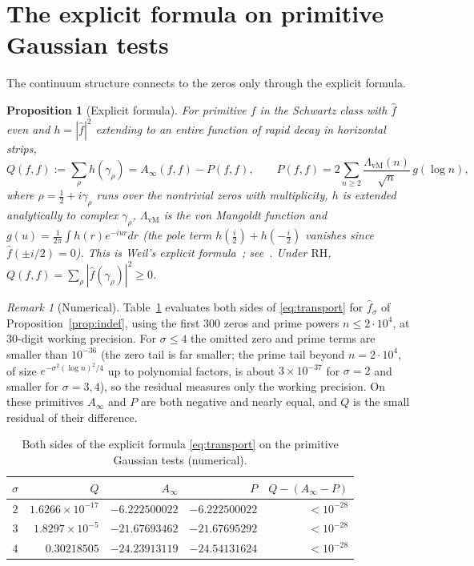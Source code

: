 \documentclass[11pt]{amsart}
\newtheorem{proposition}[theorem]{Proposition}
\theoremstyle{definition}
\theoremstyle{remark}
\newtheorem{remark}[theorem]{Remark}
\newcommand{\RH}{\mathrm{RH}}
\newcommand{\Ainf}{A_\infty}
\newcommand{\vM}{\Lambda_{\mathrm{vM}}}
\begin{document}
\section{The explicit formula on primitive Gaussian tests}\label{sec:transport}
The continuum structure connects to the zeros only through the explicit formula.

\begin{proposition}[Explicit formula]\label{prop:transport}
For primitive $f$ in the Schwartz class with $\widehat f$ even and $h=|\widehat f|^2$ extending to an
entire function of rapid decay in horizontal strips,
\begin{equation}\label{eq:transport}
Q(f,f):=\sum_\rho h(\gamma_\rho)
=\Ainf(f,f)-P(f,f),\qquad
P(f,f)=2\sum_{n\ge2}\frac{\vM(n)}{\sqrt n}\,g(\log n),
\end{equation}
where $\rho=\tfrac12+i\gamma_\rho$ runs over the nontrivial zeros with
multiplicity, $h$ is extended analytically to complex $\gamma_\rho$, $\vM$ is
the von Mangoldt function and $g(u)=\frac1{2\pi}\int h(r)e^{-iur}dr$ (the pole
term $h(\frac i2)+h(-\frac i2)$ vanishes since $\widehat f(\pm i/2)=0$). This is
Weil's explicit formula~\cite{Weil52}; see~\cite[Thm.~5.12]{bgIK}. Under $\RH$,
$Q(f,f)=\sum_\rho|\widehat f(\gamma_\rho)|^2\ge0$.
\end{proposition}

\begin{remark}[Numerical]\label{rem:transport}
Table~\ref{tab:transport} evaluates both sides of \eqref{eq:transport} for
$\widehat f_\sigma$ of Proposition~\ref{prop:indef}, using the first $300$ zeros
and prime powers $n\le2\cdot10^4$, at $30$-digit working precision. For
$\sigma\le4$ the omitted zero and prime terms are smaller than $10^{-36}$
(the zero tail is far smaller; the prime tail beyond $n=2\cdot10^4$, of size
$e^{-\sigma^2(\log n)^2/4}$ up to polynomial factors, is about $3\times10^{-37}$
for $\sigma=2$ and smaller for $\sigma=3,4$), so the residual measures only the working precision. On these
primitives $\Ainf$ and $P$ are both negative and nearly equal, and $Q$ is the
small residual of their difference.
\end{remark}

\begin{table}[h]
\centering
\begin{tabular}{c|rrrr}
$\sigma$ & $Q$ & $\Ainf$ & $P$ & $Q-(\Ainf-P)$\\\hline
$2$ & $1.6266\times10^{-17}$ & $-6.222500022$ & $-6.222500022$ & $<10^{-28}$\\
$3$ & $1.8297\times10^{-5}$ & $-21.67693462$ & $-21.67695292$ & $<10^{-28}$\\
$4$ & $0.30218505$ & $-24.23913119$ & $-24.54131624$ & $<10^{-28}$
\end{tabular}
\caption{Both sides of the explicit formula \eqref{eq:transport} on the
primitive Gaussian tests (numerical).}
\label{tab:transport}
\end{table}
\end{document}
